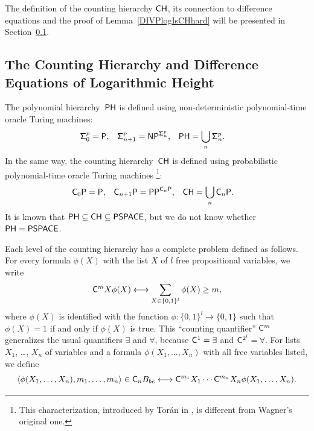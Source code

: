 The definition of the counting hierarchy $\mathsf{CH}$, 
its connection to difference equations and 
the proof of Lemma~\ref{DIVPlogIsCHhard} 
will be presented in Section~\ref{subsection: counting hierarchy}. 



\subsection{The Counting Hierarchy and Difference Equations of Logarithmic Height}
\label{subsection: counting hierarchy}

The polynomial hierarchy~$\mathsf{PH}$ is defined using non-deterministic polynomial-time oracle Turing machines: 
\begin{align}
 \mathsf{\Sigma}^p_0  &= \mathsf{P},
 &
 \mathsf{\Sigma}^p_{n+1} &= \mathsf{NP} ^{\mathsf{\Sigma}^p_n},
 &
 \mathsf{PH} &= \bigcup_n \mathsf{\Sigma}^p_n.
\end{align}
In the same way, the counting hierarchy~$\mathsf{CH}$
\cite{wagner1986complexity} 
is defined
using probabilistic polynomial-time oracle Turing machines%
\footnote{This characterization, introduced by Tor{\'a}n 
in \cite{toran1991complexity}, is different from Wagner's original one.
}: 
\begin{align} \label{eq:CH}
 \mathsf{C}_0 \mathsf{P}  &= \mathsf{P},
 &
 \mathsf{C}_{n+1} \mathsf{P} &= \mathsf{PP}^{\mathsf{C}_n \mathsf{P}},
 &
 \mathsf{CH} &= \bigcup_n \mathsf{C}_n \mathsf{P}.
\end{align}
It is known that $\mathsf{PH} \subseteq \mathsf{CH} \subseteq \mathsf{PSPACE}$, 
but we do not know whether $\mathsf{PH} = \mathsf{PSPACE}$.


Each level of the counting hierarchy 
has a complete problem defined as follows.
For every formula $\phi(X)$ with the list $X$ of $l$ free propositional variables,
we write 
\begin{equation}
 \mathsf{C}^m X \phi(X) 
  \longleftrightarrow 
  \sum_{X \in \{0,1\}^l} \phi(X) \ge m,
\end{equation}
where $\phi(X)$ is identified with the function 
$\phi \colon \{0,1\}^l \to \{0,1\}$
such that $\phi(X) = 1$ if and only if $\phi(X)$ is true.
This ``counting quantifier'' $\mathsf{C} ^m$ generalizes 
the usual quantifiers $\exists$ and $\forall$, 
because $\mathsf{C}^1 = \exists$ and $\mathsf{C}^{2^l} = \forall$.
For lists $X _1$, \ldots, $X _n$ of variables 
and a formula $\phi(X_1, \dots, X_n)$ with all free variables listed, 
we define
\begin{equation}
 \langle \phi(X_1, \dots, X_n), m_1, \dots, m_n \rangle \in \mathsf{C}_n B_{be}
 \longleftrightarrow
 \mathsf{C}^{m_1}{X_1} \cdots \mathsf{C}^{m_n}{X_n} \phi(X_1, \dots, X_n).
\end{equation}

